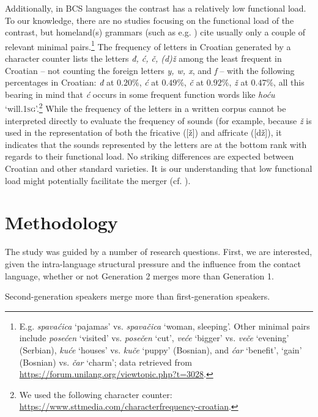 \documentclass[output=paper,
modfonts,
newtxmath,
hidelinks,
]{langscibook}
\begin{document}
Additionally, in BCS languages the contrast has a relatively low functional load. To our knowledge, there are no studies focusing on the functional load of the contrast, but homeland(s) grammars (such as e.g. \citealt{Brozovic1991}) cite usually only a couple of relevant minimal pairs.\footnote{E.g. \textit{spavaćica} `pajamas' vs. \textit{spavačica} `woman, sleeping'. Other minimal pairs include \textit{posećen} `visited' vs. \textit{posečen} `cut', \textit{veće} `bigger' vs. \textit{veče} `evening' (Serbian), \textit{kuće} `houses' vs. \textit{kuče} `puppy' (Bosnian), and \textit{ćar} `benefit', `gain' (Bosnian) vs. \textit{čar} `charm'; data retrieved from \url{https://forum.unilang.org/viewtopic.php?t=3028}.} The frequency of letters in Croatian generated by a character counter lists the letters \textit{đ, ć, č, (d)ž} among the least frequent in Croatian – not counting the foreign letters \textit{y, w, x}, and \textit{f} – with the following percentages in Croatian: \textit{đ} at $0.20\%$, \textit{ć} at $0.49\%$, \textit{č} at $0.92\%$, \textit{ž} at $0.47\%$, all this bearing in mind that \textit{ć} occurs in some frequent function words like \textit{hoću} `will.\textsc{1sg}’.\footnote{We used the following character counter: \url{https://www.sttmedia.com/characterfrequency-croatian}.} While the frequency of the letters in a written corpus cannot be interpreted directly to evaluate the frequency of sounds (for example, because \textit{ž} is used in the representation of both the fricative ([ž]) and affricate ([dž]), it indicates that the sounds represented by the letters are at the bottom rank with regards to their functional load. No striking differences are expected between Croatian and other standard varieties. It is our understanding that low functional load might potentially facilitate the merger (cf. \citealt{Wedel-etal2013}).


\section{Methodology}\label{sec:mihajlovic:4}

The study was guided by a number of research questions. First, we are interested, given the intra-language structural pressure and the influence from the contact language, whether or not Generation 2 merges more than Generation 1.


\begin{exe}
  Second-generation speakers merge more than first-generation   speakers.
\end{exe}
\end{document}
